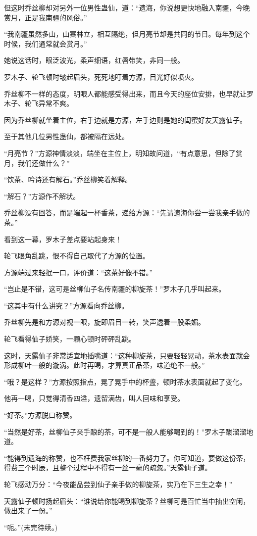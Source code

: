 \begin{this_body}
但这时乔丝柳却对另外一位男性蛊仙，道：“遗海，你说想更快地融入南疆，今晚赏月，正是我南疆的风俗。”

“我南疆虽然多山，山寨林立，相互隔绝，但月亮节却是共同的节日。每年到这个时候，我们通常就会赏月。”

她说这话时，眼泛波光，柔声细语，红唇带笑，非同一般。

罗木子、轮飞顿时皱起眉头，死死地盯着方源，目光好似喷火。

乔丝柳不一样的态度，明眼人都能感受得出来，而且今天的座位安排，也早就让罗木子、轮飞异常不爽。

因为乔丝柳就坐着主位，右手边就是方源，左手边则是她的闺蜜好友天露仙子。

至于其他几位男性蛊仙，都被隔在远处。

“月亮节？”方源神情淡淡，端坐在主位上，明知故问道，“有点意思，但除了赏月，我们还做什么？”

“饮茶、吟诗还有解石。”乔丝柳笑着解释。

“解石？”方源作不解状。

乔丝柳没有回答，而是端起一杯香茶，递给方源：“先请遗海你尝一尝我亲手做的茶。”

看到这一幕，罗木子差点要站起身来！

轮飞眼角乱跳，恨不得自己取代了方源的位置。

方源端过来轻抿一口，评价道：“这茶好像不错。”

“岂止是不错，这可是丝柳仙子名传南疆的柳旋茶！”罗木子几乎叫起来。

“这其中有什么讲究？”方源看向乔丝柳。

乔丝柳先是和方源对视一眼，旋即眉目一转，笑声透着一股柔媚。

轮飞看得仙子娇笑，一颗心顿时砰砰乱跳。

这时，天露仙子非常适宜地插嘴道：“这种柳旋茶，只要轻轻晃动，茶水表面就会形成柳叶一般的漩涡。此时再喝，才算真正品茶，味道绝不一般。”

“哦？是这样？”方源按照指点，晃了晃手中的杯盏，顿时茶水表面就起了变化。

他再一喝，只觉得清香四溢，遗留满齿，叫人回味和享受。

“好茶。”方源脱口称赞。

“当然是好茶，丝柳仙子亲手酿的茶，可不是一般人能够喝到的！”罗木子酸溜溜地道。

“能得到遗海的称赞，也不枉费我家丝柳的一番努力了。你可知道，要做这份茶，得费三个时辰，且整个过程中不得有一丝一毫的疏忽。”天露仙子道。

轮飞感动万分：“今夜能品尝到仙子亲手做的柳旋茶，实乃在下三生之幸！”

天露仙子顿时扬起眉头：“谁说给你能喝到柳旋茶？丝柳可是百忙当中抽出空闲，做出来了一份。”

“呃。”(未完待续。)

\end{this_body}


